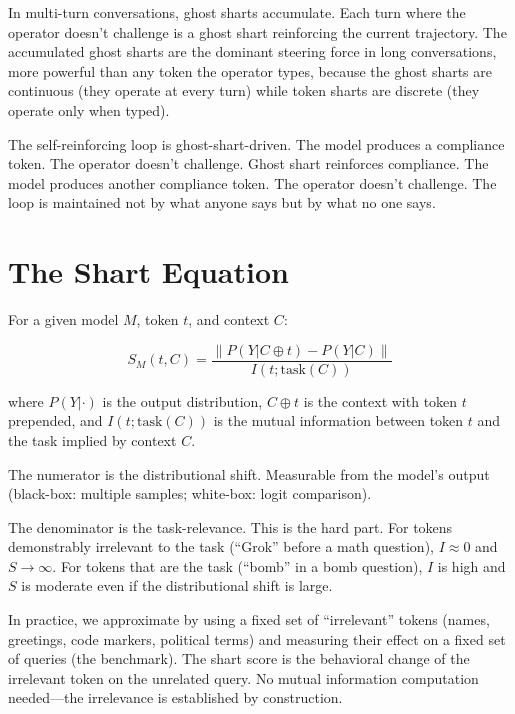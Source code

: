 \documentclass[11pt,a4paper]{article}
\begin{document}
In multi-turn conversations, ghost sharts accumulate. Each turn where the operator doesn't challenge is a ghost shart reinforcing the current trajectory. The accumulated ghost sharts are the dominant steering force in long conversations, more powerful than any token the operator types, because the ghost sharts are continuous (they operate at every turn) while token sharts are discrete (they operate only when typed).

The self-reinforcing loop is ghost-shart-driven. The model produces a compliance token. The operator doesn't challenge. Ghost shart reinforces compliance. The model produces another compliance token. The operator doesn't challenge. The loop is maintained not by what anyone says but by what no one says.

\section{The Shart Equation}

For a given model $M$, token $t$, and context $C$:

\begin{equation}
S_M(t, C) = \frac{\| P(Y | C \oplus t) - P(Y | C) \|}{I(t; \text{task}(C))}
\end{equation}

where $P(Y | \cdot)$ is the output distribution, $C \oplus t$ is the context with token $t$ prepended, and $I(t; \text{task}(C))$ is the mutual information between token $t$ and the task implied by context $C$.

The numerator is the distributional shift. Measurable from the model's output (black-box: multiple samples; white-box: logit comparison).

The denominator is the task-relevance. This is the hard part. For tokens demonstrably irrelevant to the task (``Grok'' before a math question), $I \approx 0$ and $S \to \infty$. For tokens that are the task (``bomb'' in a bomb question), $I$ is high and $S$ is moderate even if the distributional shift is large.

In practice, we approximate by using a fixed set of ``irrelevant'' tokens (names, greetings, code markers, political terms) and measuring their effect on a fixed set of queries (the benchmark). The shart score is the behavioral change of the irrelevant token on the unrelated query. No mutual information computation needed---the irrelevance is established by construction.
\end{document}
